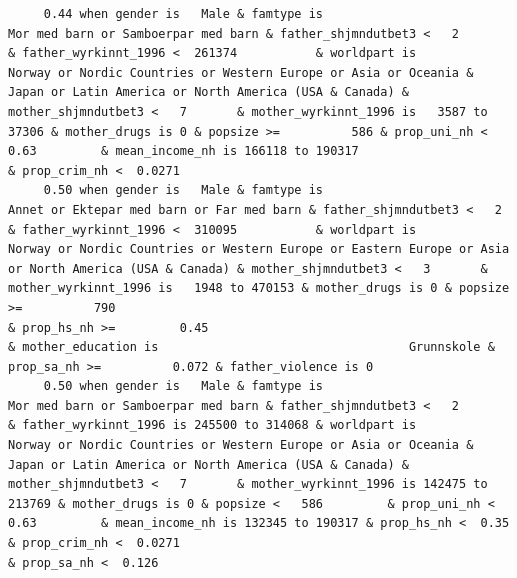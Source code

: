 \documentclass[
  letterpaper,
  DIV=11,
  numbers=noendperiod]{scrreprt}
\begin{document}
\begin{verbatim}
     0.44 when gender is   Male & famtype is                              Mor med barn or Samboerpar med barn & father_shjmndutbet3 <   2       & father_wyrkinnt_1996 <  261374           & worldpart is            Norway or Nordic Countries or Western Europe or Asia or Oceania & Japan or Latin America or North America (USA & Canada) & mother_shjmndutbet3 <   7       & mother_wyrkinnt_1996 is   3587 to  37306 & mother_drugs is 0 & popsize >=          586 & prop_uni_nh <  0.63         & mean_income_nh is 166118 to 190317                              & prop_crim_nh <  0.0271                                                                                                                                                                                                                                                                                      
     0.50 when gender is   Male & famtype is                        Annet or Ektepar med barn or Far med barn & father_shjmndutbet3 <   2       & father_wyrkinnt_1996 <  310095           & worldpart is                              Norway or Nordic Countries or Western Europe or Eastern Europe or Asia or North America (USA & Canada) & mother_shjmndutbet3 <   3       & mother_wyrkinnt_1996 is   1948 to 470153 & mother_drugs is 0 & popsize >=          790                                                                    & prop_hs_nh >=         0.45                                                                        & mother_education is                                   Grunnskole & prop_sa_nh >=          0.072 & father_violence is 0                                                                                                               
     0.50 when gender is   Male & famtype is                              Mor med barn or Samboerpar med barn & father_shjmndutbet3 <   2       & father_wyrkinnt_1996 is 245500 to 314068 & worldpart is            Norway or Nordic Countries or Western Europe or Asia or Oceania & Japan or Latin America or North America (USA & Canada) & mother_shjmndutbet3 <   7       & mother_wyrkinnt_1996 is 142475 to 213769 & mother_drugs is 0 & popsize <   586         & prop_uni_nh <  0.63         & mean_income_nh is 132345 to 190317 & prop_hs_nh <  0.35         & prop_crim_nh <  0.0271                                                                                                                  & prop_sa_nh <  0.126                                                                                                                                               

\end{verbatim}
\end{document}

